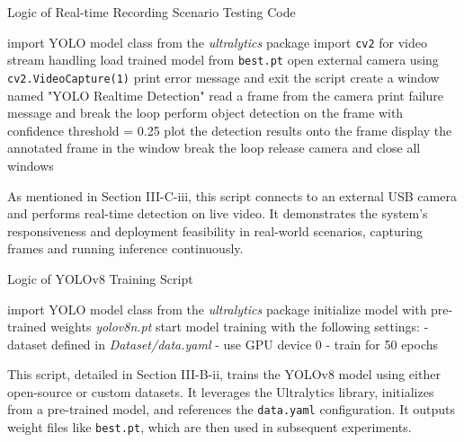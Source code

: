 \documentclass[journal,transmag]{IEEEtran}
\begin{document}
\begin{algorithm}[H]
\caption{Logic of Real-time Recording Scenario Testing Code}
\begin{algorithmic}[1]
\STATE import YOLO model class from the \textit{ultralytics} package
\STATE import \texttt{cv2} for video stream handling
\STATE load trained model from \texttt{best.pt}
\STATE open external camera using \texttt{cv2.VideoCapture(1)}
    \STATE print error message and exit the script
\ENDIF
\STATE create a window named {"YOLO Realtime Detection"}
    \STATE read a frame from the camera
        \STATE print failure message and break the loop
    \ENDIF
    \STATE perform object detection on the frame with confidence threshold = 0.25
    \STATE plot the detection results onto the frame
    \STATE display the annotated frame in the window
        \STATE break the loop
    \ENDIF
\ENDWHILE
\STATE release camera and close all windows
\end{algorithmic}
\end{algorithm}
\vspace{-1em}
As mentioned in Section III-C-iii, this script connects to an external USB camera and performs real-time detection on live video. It demonstrates the system’s responsiveness and deployment feasibility in real-world scenarios, capturing frames and running inference continuously.
\vspace{2em}
\begin{algorithm}[H]
\caption{Logic of YOLOv8 Training Script}
\begin{algorithmic}[1]
\STATE import YOLO model class from the \textit{ultralytics} package
    \STATE initialize model with pre-trained weights \textit{yolov8n.pt}
    \STATE start model training with the following settings:
    \STATE \hspace{1em} - dataset defined in \textit{Dataset/data.yaml}
    \STATE \hspace{1em} - use GPU device 0
    \STATE \hspace{1em} - train for 50 epochs
\ENDIF
\end{algorithmic}
\end{algorithm}
\vspace{-1em}
This script, detailed in Section III-B-ii, trains the YOLOv8 model using either open-source or custom datasets. It leverages the Ultralytics library, initializes from a pre-trained model, and references the \texttt{data.yaml} configuration. It outputs weight files like \texttt{best.pt}, which are then used in subsequent experiments.
\end{document}

